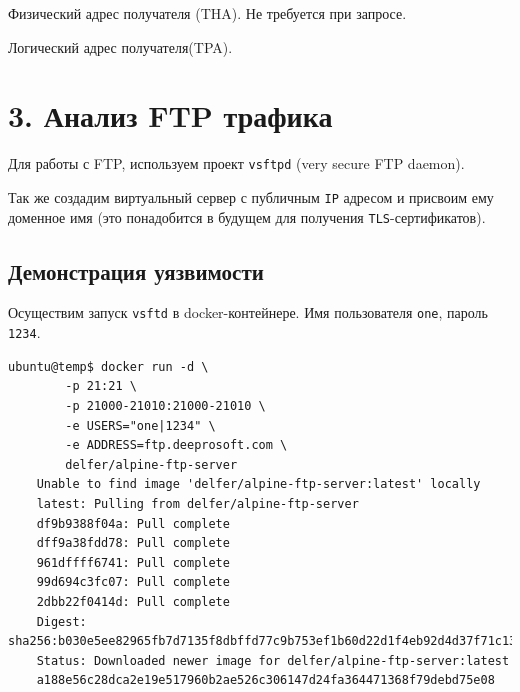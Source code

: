 Физический адрес получателя (THA). Не требуется при запросе.


Логический адрес получателя(TPA).


\section*{3. Анализ FTP трафика}

Для работы с FTP, используем проект \texttt{vsftpd} (very secure FTP daemon).

Так же создадим виртуальный сервер с публичным \texttt{IP} адресом и присвоим ему доменное имя (это понадобится в будущем для получения \texttt{TLS}-сертификатов).

\subsection*{Демонстрация уязвимости}

Осуществим запуск \texttt{vsftd} в docker-контейнере. Имя пользователя \texttt{one}, пароль \texttt{1234}.
\begin{Verbatim}[frame=single]
    ubuntu@temp$ docker run -d \
        -p 21:21 \
        -p 21000-21010:21000-21010 \
        -e USERS="one|1234" \
        -e ADDRESS=ftp.deeprosoft.com \
        delfer/alpine-ftp-server
    Unable to find image 'delfer/alpine-ftp-server:latest' locally
    latest: Pulling from delfer/alpine-ftp-server
    df9b9388f04a: Pull complete 
    dff9a38fdd78: Pull complete 
    961dffff6741: Pull complete 
    99d694c3fc07: Pull complete 
    2dbb22f0414d: Pull complete 
    Digest: sha256:b030e5ee82965fb7d7135f8dbffd77c9b753ef1b60d22d1f4eb92d4d37f71c13
    Status: Downloaded newer image for delfer/alpine-ftp-server:latest
    a188e56c28dca2e19e517960b2ae526c306147d24fa364471368f79debd75e08
\end{Verbatim}

